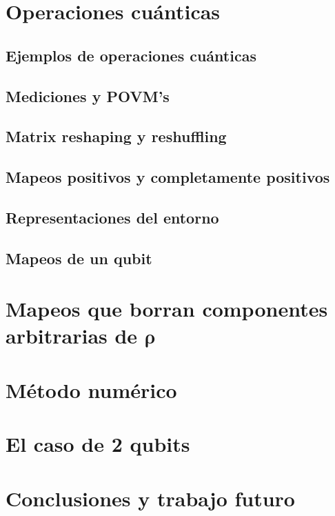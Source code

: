 \documentclass[12pt]{report}
\begin{document}
\chapter{Operaciones cuánticas}

\section{Ejemplos de operaciones cuánticas}

\section{Mediciones y POVM's}

\section{Matrix reshaping y reshuffling}

\section{Mapeos positivos y completamente positivos}

\section{Representaciones del entorno}

\section{Mapeos de un qubit}



\chapter{Mapeos que borran componentes arbitrarias de $\boldsymbol{\rho}$}



\chapter{Método numérico}



\chapter{El caso de 2 qubits}



\chapter{Conclusiones y trabajo futuro}





\end{document}
